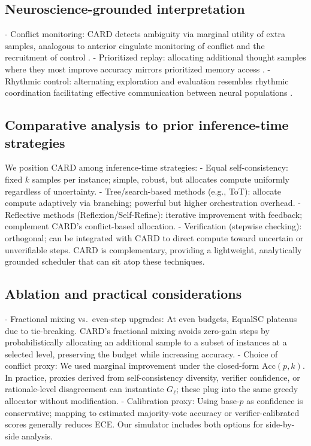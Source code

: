 \documentclass[11pt]{article}
\begin{document}
\subsection{Neuroscience-grounded interpretation}
- Conflict monitoring: CARD detects ambiguity via marginal utility of extra samples, analogous to anterior cingulate monitoring of conflict and the recruitment of control \citep{Botvinick2001ConflictMonitoring}.
- Prioritized replay: allocating additional thought samples where they most improve accuracy mirrors prioritized memory access \citep{Mattar2018PrioritizedReplay,Schaul2016PER}.
- Rhythmic control: alternating exploration and evaluation resembles rhythmic coordination facilitating effective communication between neural populations \citep{Fries2015Rhythms}.

\subsection{Comparative analysis to prior inference-time strategies}
We position CARD among inference-time strategies:
- Equal self-consistency: fixed $k$ samples per instance; simple, robust, but allocates compute uniformly regardless of uncertainty.
- Tree/search-based methods (e.g., ToT): allocate compute adaptively via branching; powerful but higher orchestration overhead.
- Reflective methods (Reflexion/Self-Refine): iterative improvement with feedback; complement CARD’s conflict-based allocation.
- Verification (stepwise checking): orthogonal; can be integrated with CARD to direct compute toward uncertain or unverifiable steps.
CARD is complementary, providing a lightweight, analytically grounded scheduler that can sit atop these techniques.

\subsection{Ablation and practical considerations}
- Fractional mixing vs.\ even-step upgrades: At even budgets, EqualSC plateaus due to tie-breaking. CARD’s fractional mixing avoids zero-gain steps by probabilistically allocating an additional sample to a subset of instances at a selected level, preserving the budget while increasing accuracy.
- Choice of conflict proxy: We used marginal improvement under the closed-form $\mathrm{Acc}(p,k)$. In practice, proxies derived from self-consistency diversity, verifier confidence, or rationale-level disagreement can instantiate $G_\ell$; these plug into the same greedy allocator without modification.
- Calibration proxy: Using base-$p$ as confidence is conservative; mapping to estimated majority-vote accuracy or verifier-calibrated scores generally reduces ECE. Our simulator includes both options for side-by-side analysis.
\end{document}
